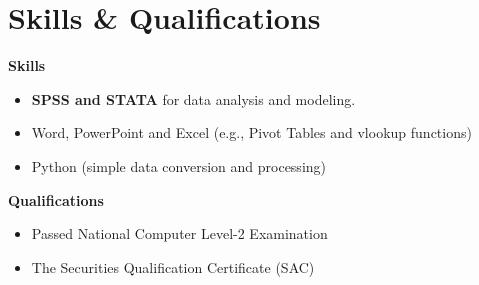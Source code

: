 \documentclass[a4paper,20pt]{article}
\begin{document}


\section{Skills \& Qualifications}

\textbf{Skills}
    \begin{itemize}
    \centering
    \justifying
   	\item{\textbf{SPSS and STATA} for data analysis and modeling.}
            \vspace{-5pt}
	\item{Word, PowerPoint and Excel (e.g., Pivot Tables and vlookup functions)}
             \vspace{-5pt}
	\item{Python (simple data conversion and processing)}
 

    \end{itemize}
\textbf{Qualifications}
    \begin{itemize}
    \centering
    \justifying
	\item{Passed National Computer Level-2 Examination}
    \vspace{-5pt}
   	\item{The Securities Qualification Certificate (SAC)}
    \end{itemize}
\end{document}
